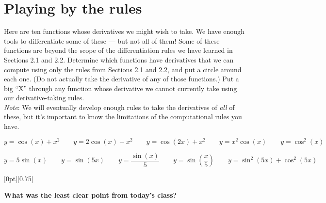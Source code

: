 \documentclass[11pt]{article}
\newcommand{\cuthere}{%
\noindent
\raisebox{-2.8pt}[0pt][0.75\baselineskip]{\small\ding{34}}
\unskip{\tiny\dotfill}
}
\begin{document}
\section{Playing by the rules}

Here are ten functions whose derivatives we might wish to take. We have enough tools to differentiate some of these --- but not all of them! Some of these functions are beyond the scope of the differentiation rules we have learned in Sections 2.1 and 2.2. Determine which functions have derivatives that we can compute using only the rules from Sections 2.1 and 2.2, and put a circle around each one. (Do not actually take the derivative of any of those functions.) Put a big ``X'' through any function whose derivative we cannot currently take using our derivative-taking rules. \\


\emph{Note}: We will eventually develop enough rules to take the derivatives of \emph{all} of these, but it's important to know the limitations of the computational rules you have. 

\[ y = \cos(x) + x^2 \qquad y = 2 \cos(x) + x^2 \qquad y = \cos(2x) + x^2 \qquad y = x^2 \cos(x) \qquad y = \cos^2(x) \] 

\vspace{1in}

\[ y = 5 \sin(x) \qquad y = \sin(5x) \qquad y = \frac{\sin(x)}{5} \qquad y = \sin(\frac{x}{5}) \qquad y = \sin^2(5x) + \cos^2(5x) \] 


\vfill

\cuthere

\noindent
\textbf{What was the least clear point from today's class?}

\vspace{1in}
\end{document}
